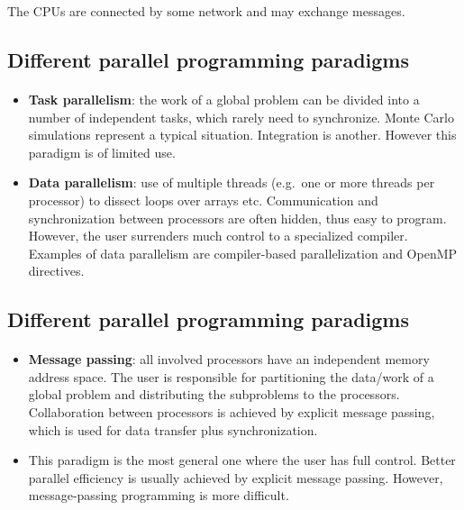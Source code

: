 \documentclass[%
oneside,                 %
final,                   %
10pt]{article}
\begin{document}
\noindent
The CPUs are connected by some network and may exchange messages.



\subsection*{Different parallel programming paradigms}

\paragraph{}

\begin{itemize}
\item \textbf{Task parallelism}:  the work of a global problem can be divided into a number of independent tasks, which rarely need to synchronize.  Monte Carlo simulations represent a typical situation. Integration is another. However this paradigm is of limited use.

\item \textbf{Data parallelism}:  use of multiple threads (e.g.~one or more threads per processor) to dissect loops over arrays etc.  Communication and synchronization between processors are often hidden, thus easy to program. However, the user surrenders much control to a specialized compiler. Examples of data parallelism are compiler-based parallelization and OpenMP directives. 
\end{itemize}

\noindent



\subsection*{Different parallel programming paradigms}

\paragraph{}

\begin{itemize}
\item \textbf{Message passing}:  all involved processors have an independent memory address space. The user is responsible for  partitioning the data/work of a global problem and distributing the  subproblems to the processors. Collaboration between processors is achieved by explicit message passing, which is used for data transfer plus synchronization.

\item This paradigm is the most general one where the user has full control. Better parallel efficiency is usually achieved by explicit message passing. However, message-passing programming is more difficult.
\end{itemize}
\end{document}
